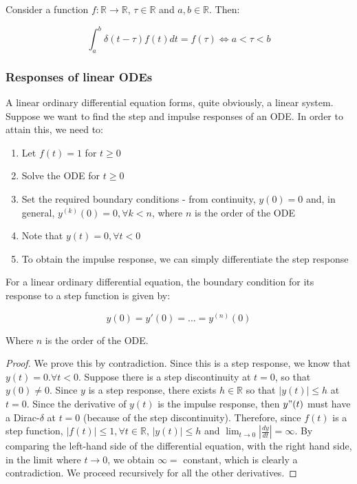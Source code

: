 \documentclass[12pt]{article}
\begin{document}
\begin{theorem}
    Consider a function $f : \mathbb{R} \to \mathbb{R}$, $\tau \in \mathbb{R}$ and $a, b \in \mathbb{R}$. Then:

    \[ \int_a^b \delta(t - \tau)f(t)dt = f(\tau) \iff a < \tau < b \]
\end{theorem}

\subsubsection{Responses of linear ODEs}

A linear ordinary differential equation forms, quite obviously, a linear system. Suppose we want to find the step and impulse responses of an ODE. In order to attain this, we need to:

\begin{enumerate}
    \item Let $f(t) = 1$ for $t \geq 0$
    \item Solve the ODE for $t \geq 0$
    \item Set the required boundary conditions - from continuity, $y(0) = 0$ and, in general, $y^{(k)}(0) = 0, \forall k < n$, where $n$ is the order of the ODE
    \item Note that $y(t) = 0, \forall t < 0$
    \item To obtain the impulse response, we can simply differentiate the step response
\end{enumerate}

\begin{proposition}
    For a linear ordinary differential equation, the boundary condition for its response to a step function is given by:

    \[ y(0) = y'(0) = \dots = y^{(n)}(0) \]

    Where $n$ is the order of the ODE.
\end{proposition}

\begin{proof}
    We prove this by contradiction. Since this is a step response, we know that $y(t) = 0. \forall t < 0$. Suppose there is a step discontinuity at $t = 0$, so that $y(0) \neq 0$. Since $y$ is a step response, there exists $h \in \mathbb{R}$ so that $|y(t)| \leq h$ at $t = 0$. Since the derivative of $y(t)$ is the impulse response, then $y"(t)$ must have a Dirac-$\delta$ at $t = 0$ (because of the step discontinuity). Therefore, since $f(t)$ is a step function, $|f(t)| \leq 1, \forall t \in \mathbb{R}$, $|y(t)| \leq h$ and $\lim_{t \to 0} |\frac{dy}{dt}| = \infty$. By comparing the left-hand side of the differential equation, with the right hand side, in the limit where $t \to 0$, we obtain $\infty = $ constant, which is clearly a contradiction. We proceed recursively for all the other derivatives.
\end{proof}
\end{document}
